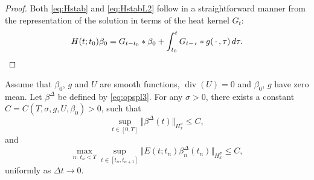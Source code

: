 \documentclass[reqno,12pt]{amsart}
\DeclareMathOperator{\dv}{div}
\begin{document}
\begin{proof}
Both \eqref{eq:Hstab} and \eqref{eq:HstabL2} follow in a straightforward manner from the representation of the solution in terms of the heat kernel $G_t$:
\[
H(t;t_0) \beta_0
=
G_{t-t_0} \ast \beta_0
+
\int_{t_0}^{t} G_{t-\tau} \ast g({\,\cdot\,}, \tau) \, d\tau.
\]

\end{proof}

\begin{lemma}
\label{lem:stabtilde}
Assume that $\beta_0$, $g$ and $U$ are smooth functions, $\dv(U) = 0$ and $\beta_0$, $g$ have zero mean. Let $\beta^\Delta$ be defined by \eqref{eq:opspl3}.
For any $\sigma >0$, there exists a constant $C = C(T,\sigma,g,U,\beta_0)>0$, such that
\[
\sup_{t\in [0,T]} \Vert {\beta}^\Delta(t) \Vert_{H^\sigma_x}
\le
C,
\]
and
\[
\max_{n:\, t_n < T}\sup_{t\in [t_n,t_{n+1}]} \Vert E(t;t_n) \beta^\Delta_n(t_n) \Vert_{H^\sigma_x} \le C,
\]
uniformly as $\Delta t\to 0$.
\end{lemma}
\end{document}
